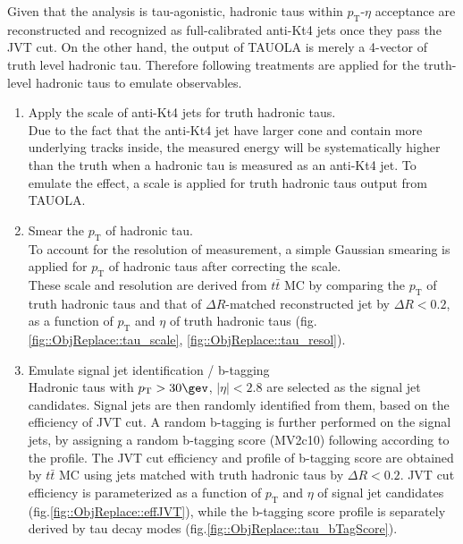 Given that the analysis is tau-agonistic, hadronic taus within $p_{\mathrm{T}}$-$\eta$ acceptance are reconstructed and recognized as full-calibrated anti-Kt4 jets once they pass the JVT cut. On the other hand, the output of TAUOLA is merely a 4-vector of truth level hadronic tau. Therefore following treatments are applied for the truth-level hadronic taus to emulate observables.\\

\begin{enumerate}
\item Apply the scale of anti-Kt4 jets for truth hadronic taus. \\
Due to the fact that the anti-Kt4 jet have larger cone and contain more underlying tracks inside, the measured energy will be systematically higher than the truth when a hadronic tau is measured as an anti-Kt4 jet. To emulate the effect, a scale is applied for truth hadronic taus output from TAUOLA. \\

\item Smear the $p_{\mathrm{T}}$ of hadronic tau. \\
To account for the resolution of measurement, a simple Gaussian smearing is applied for $p_{\mathrm{T}}$ of hadronic taus after correcting the scale. \\

These scale and resolution are derived from $t\bar{t}$ MC by comparing the $p_{\mathrm{T}}$ of truth hadronic taus and that of $\Delta R$-matched reconstructed jet by $\Delta R<0.2$, as a function of $p_{\mathrm{T}}$ and $\eta$ of truth hadronic taus (fig.\ref{fig::ObjReplace::tau_scale}, \ref{fig::ObjReplace::tau_resol}).

\item Emulate signal jet identification / b-tagging  \\
Hadronic taus with $p_{\mathrm{T}}>30\gev$, $|\eta|<2.8$ are selected as the signal jet candidates.
Signal jets are then randomly identified from them, based on the efficiency of JVT cut. A random b-tagging is further performed on the signal jets, by assigning a random b-tagging score (MV2c10) following according to the profile. The JVT cut efficiency and profile of b-tagging score are obtained by $t\bar{t}$ MC using jets matched with truth hadronic taus by $\Delta R<0.2$. JVT cut efficiency is parameterized as a function of $p_{\mathrm{T}}$ and $\eta$ of signal jet candidates (fig.\ref{fig::ObjReplace::effJVT}), while the b-tagging score profile is separately derived by tau decay modes (fig.\ref{fig::ObjReplace::tau_bTagScore}).
\end{enumerate}


